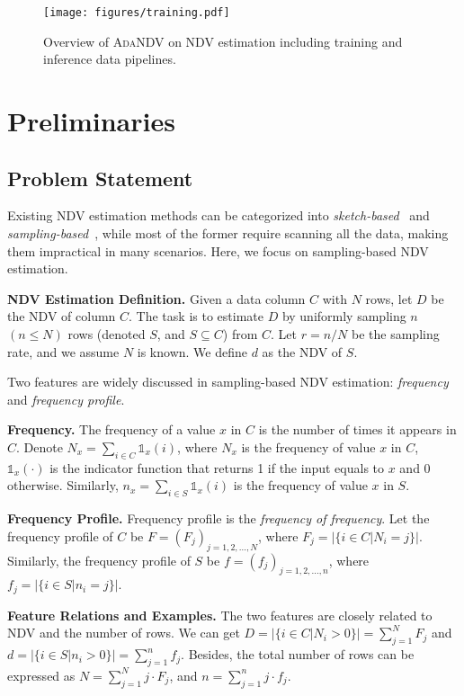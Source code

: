 \begin{figure*}[t]
    \centering
    \texttt{[image: figures/training.pdf]}
    \caption{Overview of \textsc{AdaNDV} on NDV estimation including training and inference data pipelines.}
    \label{fig:model_pipeline}
\end{figure*}

\section{Preliminaries}
\subsection{Problem Statement}\label{sec:statement}
Existing NDV estimation methods can be categorized into \textit{sketch-based}~\cite{harmouch2017cardinality,flajolet2007hyperloglog,ertl2023ultraloglog} and \textit{sampling-based}~\cite{goodman1949estimation,ls_wu2022learning,li2024learning}, while most of the former require scanning all the data, making them impractical in many scenarios. Here, we focus on sampling-based NDV estimation.


\noindent\textbf{NDV Estimation Definition.} Given a data column $C$ with $N$ rows, let $D$ be the NDV of column $C$. The task is to estimate $D$ by uniformly sampling $n$ $(n\leq N)$ rows (denoted $S$, and $S\subseteq  C$) from $C$. Let $r=n/N$ be the sampling rate, and we assume $N$ is known. We define $d$ as the NDV of $S$. 

Two features are widely discussed in sampling-based NDV estimation: \textit{frequency} and \textit{frequency profile}.


\noindent\textbf{Frequency.} The frequency of a value $x$ in $C$ is the number of times it appears in $C$. Denote $N_x=\sum_{i\in C} \mathds{1}_x(i)$, where $N_x$ is the frequency of value $x$ in $C$, $\mathds{1}_x(\cdot)$ is the indicator function that returns 1 if the input equals to $x$ and 0 otherwise. Similarly, $n_x=\sum_{i\in S} \mathds{1}_x(i)$ is the frequency of value $x$ in $S$. 


\noindent\textbf{Frequency Profile.} Frequency profile is the \textit{frequency of frequency}. Let the frequency profile of $C$ be $F=(F_j)_{j=1,2,\ldots,N}$, where $F_j=|\{i\in C|N_i=j\}|$. Similarly, the frequency profile of $S$ be $f=(f_j)_{j=1,2,\ldots,n}$, where $f_j=|\{i\in S|n_i=j\}|$.


\noindent\textbf{Feature Relations and Examples.} The two features are closely related to NDV and the number of rows. We can get $D=|\{i\in C|N_i>0\}|=\sum_{j=1}^N F_j$ and $d=|\{i\in S|n_i>0\}|=\sum_{j=1}^n f_j$. Besides, the total number of rows can be expressed as $N=\sum_{j=1}^N j\cdot F_j$, and $n=\sum_{j=1}^n j\cdot f_j$. 

